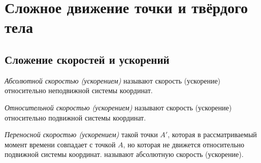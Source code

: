 \section{Сложное движение точки и твёрдого тела}

\subsection{Сложение скоростей и ускорений}

\begin{to_def} 
\phantom{42}

    \textit{Абсолютной скоростью (ускорением)}  называют скорость (ускорение) относительно неподвижной системы координат. 

    \textit{Относительной скоростью (ускорением)}  называют скорость (ускорение) относительно подвижной системы координат.

    \textit{Переносной скоростью (ускорением)} такой точки $A'$, которая в рассматриваемый момент времени совпадает с точкой $A$, но которая не движется относительно подвижной системы координат.
    называют абсолютную скорость (ускорение).
\end{to_def}

